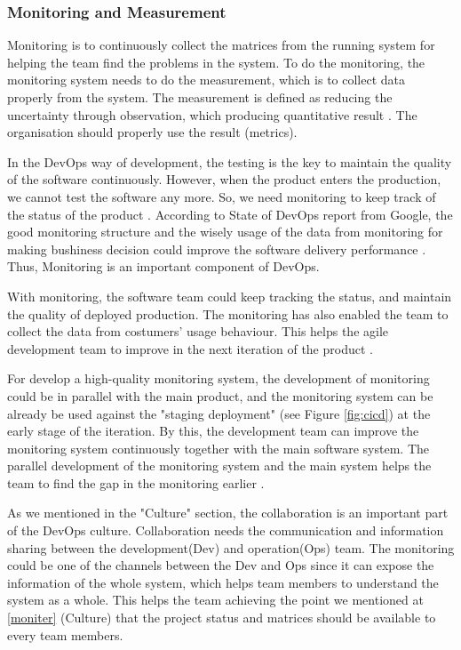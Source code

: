 \subsubsection[]{Monitoring and Measurement}
Monitoring is to continuously collect the matrices from the running system for helping the team find the problems in the system. To do the monitoring, the monitoring system needs to do the measurement, which is to collect data properly from the system. The measurement is defined as reducing the uncertainty through observation, which producing quantitative result \cite{hering2015measure}. The organisation should properly use the result (metrics).
\par
In the DevOps way of development, the testing is the key to maintain the quality of the software continuously. However, when the product enters the production, we cannot test the software any more. So, we need monitoring to keep track of the status of the product \cite{huttermann2012devops}. According to State of DevOps report from Google, the good monitoring structure and the wisely usage of the data from monitoring for making bushiness decision could improve the software delivery performance \cite{forsgrenaccelerate}. Thus, Monitoring is an important component of DevOps.
\par
With monitoring, the software team could keep tracking the status, and maintain the quality of deployed production. The monitoring has also enabled the team to collect the data from costumers' usage behaviour. This helps the agile development team to improve in the next iteration of the product \cite{lwakatare2015dimensions}.
\par
For develop a high-quality monitoring system, the development of monitoring could be in parallel with the main product, and the monitoring system can be already be used against the "staging deployment" (see Figure \ref{fig:cicd}) at the early stage of the iteration. By this, the development team can improve the monitoring system continuously together with the main software system. The parallel development of the monitoring system and the main system helps the team to find the gap in the monitoring earlier \cite{huttermann2012devops}.
\par
As we mentioned in the "Culture" section, the collaboration is an important part of the DevOps culture. Collaboration needs the communication and information sharing between the development(Dev) and operation(Ops) team. The monitoring could be one of the channels between the Dev and Ops since it can expose the information of the whole system, which helps team members to understand the system as a whole. This helps the team achieving the point we mentioned at \ref{moniter} (Culture) that the project status and matrices should be available to every team members.
